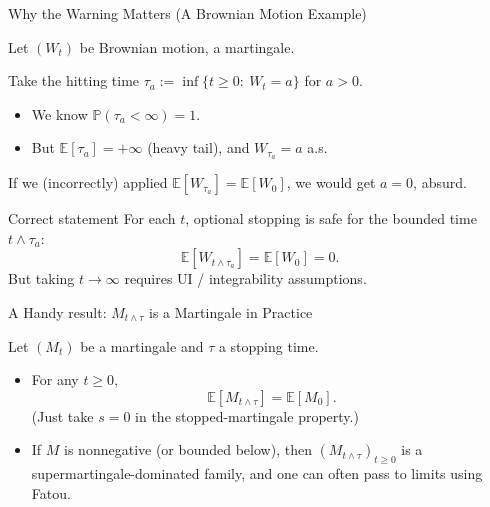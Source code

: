 \documentclass[10pt,aspectratio=169]{beamer}
\newcommand{\E}{\mathbb{E}}
\begin{document}
\begin{frame}{Why the Warning Matters (A Brownian Motion Example)}

Let $(W_t)$ be Brownian motion, a martingale.\pause

\medskip
Take the hitting time $\tau_a:=\inf\{t\ge 0:\ W_t=a\}$ for $a>0$.\pause

\begin{itemize}
  \item We know $\mathbb{P}(\tau_a<\infty)=1$.\pause
  \item But $\E[\tau_a]=+\infty$ (heavy tail), and $W_{\tau_a}=a$ a.s.\pause
\end{itemize}

\medskip
If we (incorrectly) applied $\E[W_{\tau_a}]=\E[W_0]$, we would get $a=0$, absurd.\pause

\begin{block}{Correct statement}
For each $t$, optional stopping is safe for the bounded time $t\wedge\tau_a$:
\[
\E[W_{t\wedge\tau_a}] = \E[W_0]=0.
\]
But taking $t\to\infty$ requires UI / integrability assumptions.
\end{block}

\end{frame}

\begin{frame}{A Handy result: $M_{t\wedge\tau}$ is a Martingale in Practice}

Let $(M_t)$ be a martingale and $\tau$ a stopping time.\pause

\begin{itemize}
  \item For any $t\ge 0$,
  \[
  \E[M_{t\wedge\tau}] = \E[M_0].
  \]
  (Just take $s=0$ in the stopped-martingale property.)\pause

  \item If $M$ is nonnegative (or bounded below), then $(M_{t\wedge\tau})_{t\ge 0}$
  is a supermartingale-dominated family, and one can often pass to limits using Fatou.\pause
\end{itemize}

\end{frame}
\end{document}
